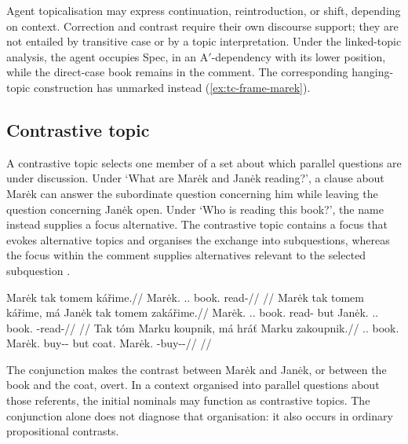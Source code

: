 Agent topicalisation may express continuation, reintroduction, or shift,
 depending on context. Correction and contrast require their own discourse
 support; they are not entailed by transitive case or by a topic
 interpretation. Under the linked-topic analysis, the agent occupies Spec, in an A$'$-dependency with its lower position,
 while the direct-case book remains in the comment. The corresponding
 hanging-topic construction has unmarked  instead
 (\ref{ex:tc-frame-marek}).

\subsection{Contrastive topic}\label{sec:tc-contrastive-topic}

A contrastive topic selects one member of a set about which parallel questions
 are under discussion. Under `What are Marėk and Janėk reading?', a clause
 about Marėk can answer the subordinate question concerning him while leaving
 the question concerning Janėk open. Under `Who is reading this book?', the
 name instead supplies a focus alternative. The contrastive topic contains a focus that evokes alternative
 topics and organises the exchange into subquestions, whereas the focus
 within the comment supplies alternatives relevant to the selected subquestion
 \cite[§§\,5.2, 6.2]{krifka2008}.

\pex\label{ex:tc-ctop}
\a\label{ex:tc-ctop-ordinary}%
\begingl
\gla Marėk tak tomem kářime.//
\glb Marėk.\Dir{} \Dem{}.\Prox{}.\Dir{} book.\Ind{} read-\Prog{}//
\glft {}
      //
\endgl
\a\label{ex:tc-ctop-contr}%
\begingl
\gla Marėk tak tomem kářime, má Janėk tak tomem zakářime.//
\glb Marėk.\Dir{} \Dem{}.\Prox{}.\Dir{} book.\Ind{} read-\Prog{} but Janėk.\Dir{} \Dem{}.\Prox{}.\Dir{} book.\Ind{} \Neg{}-read-\Prog{}//
\glft {}
      //
\endgl
\a\label{ex:tc-ctop-obj}%
\begingl
\gla Tak tóm Marku koupnik, má hráť Marku zakoupnik.//
\glb \Dem{}.\Prox{}.\Dir{} book.\Dir{} Marėk.\Trs{} buy-\Trs{}-\Pf{} but coat.\Dir{} Marėk.\Trs{} \Neg{}-buy-\Trs{}-\Pf{}//
\glft {}
      //
\endgl
\xe

\noindent The conjunction  makes the contrast between Marėk and
 Janėk, or between the book and the coat, overt. In a context organised into
 parallel questions about those referents, the initial nominals may function
 as contrastive topics. The conjunction alone does not diagnose that
 organisation: it also occurs in ordinary propositional contrasts.

